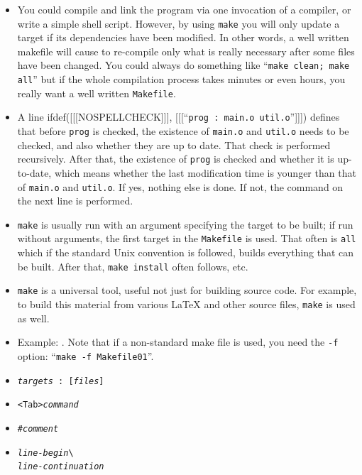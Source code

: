 \begin{itemize}
\item You could compile and link the program via one invocation of a compiler,
or write a simple shell script.  However, by using \texttt{make} you will only
update a target if its dependencies have been modified.  In other words, a well
written makefile will cause to re-compile only what is really necessary after
some files have been changed.  You could always do something like
``\texttt{make clean; make all}'' but if the whole compilation process takes
minutes or even hours, you really want a well written \texttt{Makefile}.
\item A line ifdef([[[NOSPELLCHECK]]], [[[``\verb#prog : main.o util.o#'']]])
defines that before \texttt{prog} is checked, the existence of
\texttt{main.o} and \texttt{util.o} needs to be checked, and also whether they
are up to date.  That check is performed recursively.  After that, the existence
of \texttt{prog} is checked and whether it is up-to-date, which means whether
the last modification time is younger than that of \texttt{main.o} and
\texttt{util.o}.  If yes, nothing else is done.  If not, the command on the next
line is performed.
\item \texttt{make} is usually run with an argument specifying the target to be
built; if run without arguments, the first target in the \texttt{Makefile} is
used.  That often is \texttt{all} which if the standard Unix convention is
followed, builds everything that can be built.  After that, \texttt{make
install} often follows, etc.
\item \texttt{make} is a universal tool, useful not just for building source
code.  For example, to build this material from various \LaTeX{} and other source
files, \texttt{make} is used as well.
\item Example: .  Note that if a non-standard
make file is used, you need the \texttt{-f} option: ``\texttt{make -f
Makefile01}''.
\end{itemize}


\begin{slide}
\begin{itemize}
\item {}
\texttt{\emph{targets} : [\emph{files}]}
\item {} \verb#<Tab>#\texttt{\emph{command}}
\item {} \texttt{\#\emph{comment}}
\item {}
\texttt{\emph{line-begin}}\verb#\#\\
\makebox[4cm][l]{~} \texttt{\emph{line-continuation}}

\end{itemize}
\end{slide}

